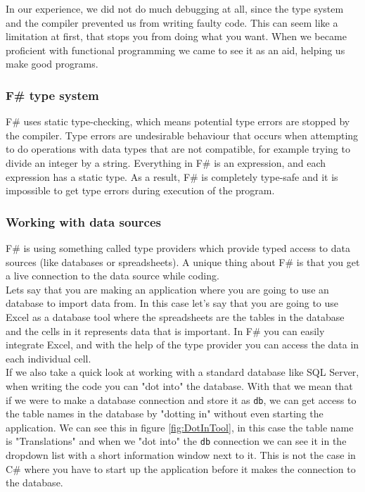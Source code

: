 \documentclass[12pt, a4paper]{article}
\newcommand{\code}[1]{{\small \texttt{#1}}}
\begin{document}
In our experience, we did not do much debugging at all, since the type system and the compiler prevented us from writing faulty code. This can seem like a limitation at first, that stops you from doing what you want. When we became proficient with functional programming we came to see it as an aid, helping us make good programs.

\subsubsection{F\# type system}
F\# uses static type-checking, which means potential type errors are stopped by the compiler. Type errors are undesirable behaviour that occurs when attempting to do operations with data types that are not compatible, for example trying to divide an integer by a string. Everything in F\# is an expression, and each expression has a static type. As a result, F\# is completely type-safe and it is impossible to get type errors during execution of the program.

\newpage

\subsubsection{Working with data sources}

F\# is using something called type providers which provide typed access to data sources (like databases or spreadsheets). A unique thing about F\# is that you get a live connection to the data source while coding.\\

Lets say that you are making an application where you are going to use an database to import data from. In this case let's say that you are going to use Excel as a database tool where the spreadsheets are the tables in the database and the cells in it represents data that is important. In F\# you can easily integrate Excel, and with the help of the type provider you can access the data in each individual cell.\\

If we also take a quick look at working with a standard database like SQL Server, when writing the code you can "dot into" the database. With that we mean that if we were to make a database connection and store it as \code{db}, we can get access to the table names in the database by "dotting in" without even starting the application. We can see this in figure \ref{fig:DotInTool}, in this case the table name is "Translations" and when we "dot into" the \code{db} connection we can see it in the dropdown list with a short information window next to it. This is not the case in C\# where you have to start up the application before it makes the connection to the database.\\
\end{document}
